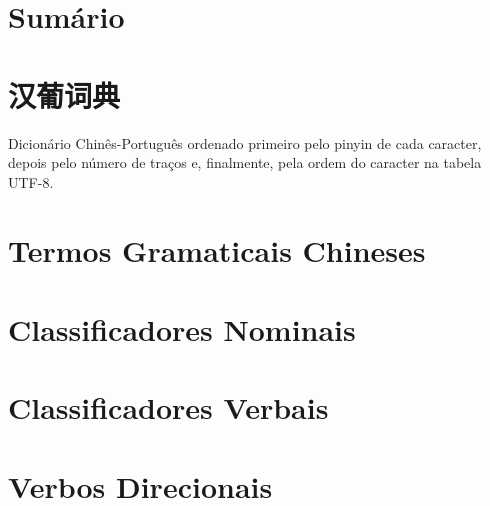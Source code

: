 \documentclass[a4paper,9pt,twoside,openright]{memoir}
\begin{document}



\pagestyle{plain}

\clearpage
\chapter{Sumário}
\begin{KeepFromToc}
 \renewcommand{\contentsname}{}%
 \tableofcontents
\end{KeepFromToc}

\clearpage
\chapter{汉葡词典}

%
%

Dicionário Chinês-Português ordenado primeiro pelo pinyin de cada
caracter, depois pelo número de traços e, finalmente, pela ordem do
caracter na tabela UTF-8.

\clearpage
\pagestyle{dictionary}
\ifdraftdoc

\else

\fi

\pagestyle{plain}

\ifdraftdoc
%
%
%
\else

\clearpage
\chapter{Termos Gramaticais Chineses}


\clearpage
\chapter{Classificadores Nominais}


\clearpage
\chapter{Classificadores Verbais}


\clearpage
\chapter{Verbos Direcionais}

\end{document}
